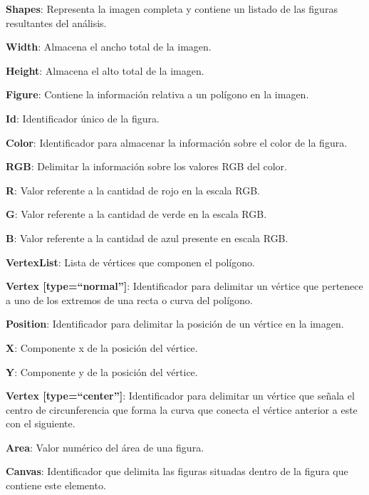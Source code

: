 	\begin{longenum}
	\item \textbf{Shapes}: Representa la imagen completa y contiene un listado de las figuras resultantes del análisis.
	\item \textbf{Width}: Almacena el ancho total de la imagen.
	\item \textbf{Height}: Almacena el alto total de la imagen.
	\item \textbf{Figure}: Contiene la información relativa a un polígono en la imagen.
		\begin{longenum}
		\item \textbf{Id}: Identificador único de la figura.
		\item \textbf{Color}: Identificador para almacenar la información sobre el color de la figura.
			\begin{longenum}
			\item \textbf {RGB}: Delimitar la información sobre los valores RGB del color.
				\begin{longenum}
				\item \textbf{R}: Valor referente a la cantidad de rojo en la escala RGB.
				\item \textbf{G}: Valor referente a la cantidad de verde en la escala RGB.
				\item \textbf{B}: Valor referente a la cantidad de azul presente en escala RGB.
				\end{longenum}
			\end{longenum}
		\item \textbf{VertexList}: Lista de vértices que componen el polígono.
			\begin{longenum}
			\item \textbf{Vertex [type=``normal'']}: Identificador para delimitar un vértice que pertenece a uno de los extremos de una recta o curva del polígono.
				\begin{longenum}
					\item \textbf{Position}: Identificador para delimitar la posición de un vértice en la imagen.
						\begin{longenum}
						\item \textbf{X}: Componente x de la posición del vértice.
						\item \textbf{Y}: Componente y de la posición del vértice.
						\end{longenum}
					\item \textbf{Vertex [type=``center'']}: Identificador para delimitar un vértice que señala el centro de circunferencia que forma la curva que conecta el vértice anterior a este con el siguiente.
				\end{longenum}
			\end{longenum}
		\end{longenum}
		\item \textbf{Area}: Valor numérico del área de una figura.
		\item \textbf{Canvas}: Identificador que delimita las figuras situadas dentro de la figura que contiene este elemento. 
	\end{longenum}
	
